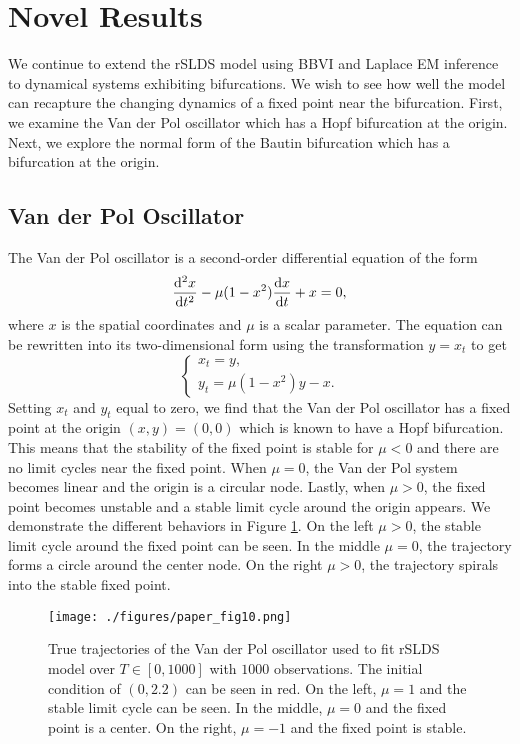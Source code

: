 \section{Novel Results}
We continue to extend the rSLDS model using BBVI and Laplace EM inference to dynamical systems exhibiting bifurcations. We wish to see how well the model can recapture the changing dynamics of a fixed point near the bifurcation. First, we examine the Van der Pol oscillator which has a Hopf bifurcation at the origin. Next, we explore the normal form of the Bautin bifurcation which has a bifurcation at the origin.  

\subsection{Van der Pol Oscillator}
The Van der Pol oscillator is a second-order differential equation of the form
\[
    \frac{{\mathrm{d}}^2 x}{{\mathrm{d}} t^2} - \mu(1 - x^2)\frac{{\mathrm{d}} x}{{\mathrm{d}} t} + x = 0,
\]
where $x$ is the spatial coordinates and $\mu$ is a scalar parameter. The equation can be rewritten into its two-dimensional form using the transformation $y = x_t$ to get
\[
    \begin{cases}
        x_t = y,\\
        y_t = \mu(1-x^2)y - x.
    \end{cases}
\]
Setting $x_t$ and $y_t$ equal to zero, we find that the Van der Pol oscillator has a fixed point at the origin $(x,y) = (0,0)$ which is known to have a Hopf bifurcation. This means that the stability of the fixed point is stable for $\mu < 0$ and there are no limit cycles near the fixed point. When $\mu = 0$, the Van der Pol system becomes linear and the origin is a circular node. Lastly, when $\mu > 0$, the fixed point becomes unstable and a stable limit cycle around the origin appears. We demonstrate the different behaviors in Figure \ref{trueVDP}. On the left $\mu > 0$, the stable limit cycle around the fixed point can be seen. In the middle $\mu =0$, the trajectory forms a circle around the center node. On the right $\mu > 0$, the trajectory spirals into the stable fixed point. 

\begin{figure}
    \centering
\texttt{[image: ./figures/paper\_fig10.png]}
    \caption{True trajectories of the Van der Pol oscillator used to fit rSLDS model over $T\in[0,1000]$ with $1000$ observations. The initial condition of $(0,2.2)$ can be seen in red. On the left, $\mu =1$ and the stable limit cycle can be seen. In the middle, $\mu = 0$ and the fixed point is a center. On the right, $\mu = -1$ and the fixed point is stable.}
    \label{trueVDP}
\end{figure}

